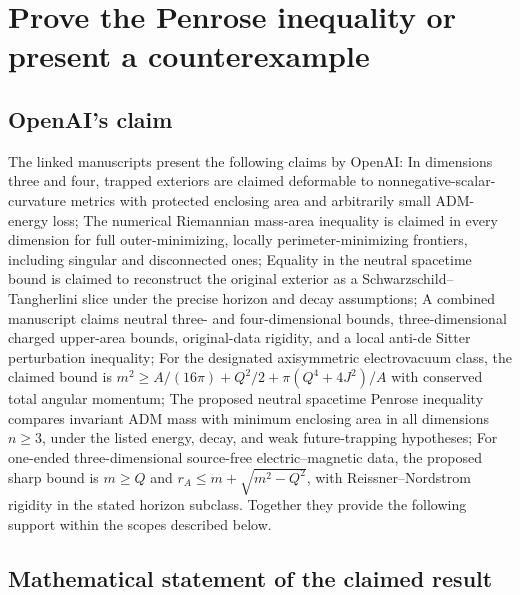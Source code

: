 \documentclass[11pt]{article}
\begin{document}
\section*{Prove the Penrose inequality or present a counterexample}

\subsection{OpenAI's claim}
The linked manuscripts present the following claims by OpenAI: In dimensions three and four, trapped exteriors are claimed deformable to nonnegative-scalar-curvature metrics with protected enclosing area and arbitrarily small ADM-energy loss; The numerical Riemannian mass-area inequality is claimed in every dimension for full outer-minimizing, locally perimeter-minimizing frontiers, including singular and disconnected ones; Equality in the neutral spacetime bound is claimed to reconstruct the original exterior as a Schwarzschild--Tangherlini slice under the precise horizon and decay assumptions; A combined manuscript claims neutral three- and four-dimensional bounds, three-dimensional charged upper-area bounds, original-data rigidity, and a local anti-de Sitter perturbation inequality; For the designated axisymmetric electrovacuum class, the claimed bound is $m^2\geq A/(16\pi)+Q^2/2+\pi(Q^4+4J^2)/A$ with conserved total angular momentum; The proposed neutral spacetime Penrose inequality compares invariant ADM mass with minimum enclosing area in all dimensions $n\geq3$, under the listed energy, decay, and weak future-trapping hypotheses; For one-ended three-dimensional source-free electric--magnetic data, the proposed sharp bound is $m\geq Q$ and $r_A\leq m+\sqrt{m^2-Q^2}$, with Reissner--Nordstrom rigidity in the stated horizon subclass. Together they provide the following support within the scopes described below.

\subsection{Mathematical statement of the claimed result}
\end{document}
